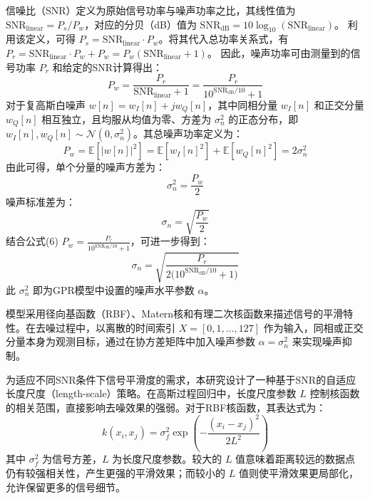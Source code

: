 \documentclass{article}
\begin{document}
信噪比（SNR）定义为原始信号功率与噪声功率之比，其线性值为 $\mathrm{SNR}_{\text{linear}} = P_s/P_w$，对应的分贝（dB）值为 $\mathrm{SNR}_{\text{dB}} = 10\log_{10}(\mathrm{SNR}_{\text{linear}})$。
利用该定义，可得 $P_s = \mathrm{SNR}_{\text{linear}} \cdot P_w$。将其代入总功率关系式，有 $P_r = \mathrm{SNR}_{\text{linear}} \cdot P_w + P_w = P_w(\mathrm{SNR}_{\text{linear}} + 1)$。
因此，噪声功率可由测量到的信号功率 $P_r$ 和给定的SNR计算得出：
\begin{equation}
P_w = \frac{P_r}{\mathrm{SNR}_{\text{linear}} + 1} = \frac{P_r}{10^{\mathrm{SNR}_{\text{dB}}/10} + 1}
\end{equation}
对于复高斯白噪声 $w[n]=w_I[n]+jw_Q[n]$，其中同相分量 $w_I[n]$ 和正交分量 $w_Q[n]$ 相互独立，且均服从均值为零、方差为 $\sigma_n^2$ 的正态分布，即 $w_I[n],w_Q[n]\sim\mathcal{N}(0,\sigma_n^2)$。其总噪声功率定义为：
\begin{equation}
P_w=\mathbb{E}[|w[n]|^2]
=\mathbb{E}[w_I[n]^2]+\mathbb{E}[w_Q[n]^2]
=2\sigma_n^2
\end{equation}
由此可得，单个分量的噪声方差为：
\begin{equation}
\sigma_n^2=\frac{P_w}{2}
\end{equation}
噪声标准差为：
\begin{equation}
\sigma_n=\sqrt{\frac{P_w}{2}}
\end{equation}
结合公式(6) $P_w=\frac{P_r}{10^{\mathrm{SNR}_{\mathrm{dB}}/10}+1}$，可进一步得到：
\begin{equation}
\sigma_n=\sqrt{\frac{P_r}{2\bigl(10^{\mathrm{SNR}_{\mathrm{dB}}/10}+1\bigr)}}
\end{equation}
\label{eq:sigma_n_calc}
此 $\sigma_n^2$ 即为GPR模型中设置的噪声水平参数 $\alpha$。

模型采用径向基函数（RBF）、Matern核和有理二次核函数来描述信号的平滑特性。在去噪过程中，以离散的时间索引 $X=[0,1,\ldots,127]$ 作为输入，同相或正交分量本身为观测目标，通过在协方差矩阵中加入噪声参数 $\alpha=\sigma_n^2$ 来实现噪声抑制。

为适应不同SNR条件下信号平滑度的需求，本研究设计了一种基于SNR的自适应长度尺度（length-scale）策略。在高斯过程回归中，长度尺度参数 $L$ 控制核函数的相关范围，直接影响去噪效果的强弱。对于RBF核函数，其表达式为：
\begin{equation}
k(x_i, x_j) = \sigma_f^2 \exp\left(-\frac{(x_i - x_j)^2}{2L^2}\right)
\end{equation}
其中 $\sigma_f^2$ 为信号方差，$L$ 为长度尺度参数。较大的 $L$ 值意味着距离较远的数据点仍有较强相关性，产生更强的平滑效果；而较小的 $L$ 值则使平滑效果更局部化，允许保留更多的信号细节。
\end{document}
